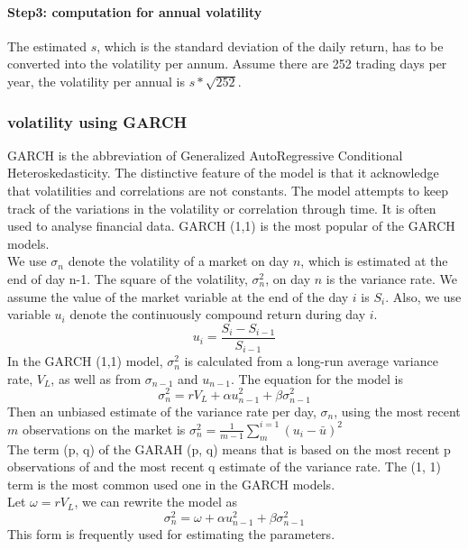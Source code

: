 \paragraph{Step3: computation for annual volatility}
The estimated $s$, which is the standard deviation of the daily return, has to be converted into the volatility per annum. Assume there are 252 trading days per year, the volatility per annual is $s*\sqrt{252}$.\cite{Bible}
\subsubsection{volatility using GARCH}
GARCH is the abbreviation of Generalized AutoRegressive Conditional Heteroskedasticity. The distinctive feature of the model is that it acknowledge that volatilities and correlations are not constants. The model attempts to keep track of the variations in the volatility or correlation through time. It is often used to analyse financial data. GARCH (1,1) is the most popular of the GARCH models.\cite{BSG} \\
We use $\sigma_n$ denote the volatility of a market on day $n$, which is estimated at the end of day n-1. The square of the volatility, $\sigma_n^2$, on day $n$ is the variance rate. We assume the value of the market variable at the end of the day $i$ is $S_i$. Also, we use variable $u_i$ denote the continuously compound return during day $i$.
\begin{equation}
u_i=\frac{S_i-S_{i-1}}{S_{i-1}}
\end{equation}
In the GARCH (1,1) model, $\sigma_n^2$ is calculated from a long-run average variance rate, $V_L$, as well as from $\sigma_{n-1}$ and $u_{n-1}$. The equation for the model is 
\begin{equation}
\sigma_n^2=r V_L +\alpha u_{n-1}^2+\beta \sigma_{n-1}^2
\end{equation}
Then an unbiased estimate of the variance rate per day, $\sigma_n$, using the most recent $m$ observations on the market is $\sigma_n^2=\frac{1}{m-1}\sum_{m}^{i=1}(u_i-\bar{u})^2$\\
The term (p, q) of the GARAH (p, q) means that  is based on the most recent p observations of and the most recent q estimate of the variance rate. The (1, 1) term is the most common used one in the GARCH models.\cite{GARCH}\\
Let $\omega=r V_L$, we can rewrite the model as 
\begin{equation}
\sigma_n^2=\omega+\alpha u_{n-1}^2+\beta \sigma_{n-1}^2
\end{equation}
This form is frequently used for estimating the parameters.
